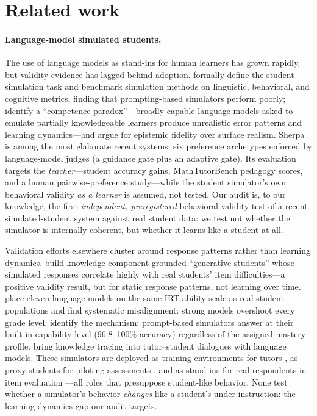 \documentclass[12pt,a4paper]{article}
\begin{document}
\section{Related work}
\label{sec:related}

\paragraph{Language-model simulated students.} The use of language models as
stand-ins for human learners has grown rapidly, but validity evidence has
lagged behind adoption. \citet{scarlatos2026} formally define the
student-simulation task and benchmark simulation methods on linguistic,
behavioral, and cognitive metrics, finding that prompting-based simulators
perform poorly; \citet{yuan2026} identify a ``competence paradox''---broadly
capable language models asked to emulate partially knowledgeable learners
produce unrealistic error patterns and learning dynamics---and argue for
epistemic fidelity over surface realism. Sherpa \citep{xu2026sherpa} is
among the most elaborate recent systems: six preference archetypes enforced
by language-model judges (a guidance gate plus an adaptive gate). Its
evaluation targets the \emph{teacher}---student accuracy gains,
MathTutorBench pedagogy scores, and a human pairwise-preference study---while
the student simulator's own behavioral validity \emph{as a learner} is
assumed, not tested. Our audit is, to our knowledge, the first
\emph{independent, preregistered} behavioral-validity test of a recent
simulated-student system against real student data: we test not whether the
simulator is internally coherent, but whether it learns like a student at
all.

Validation efforts elsewhere cluster around response patterns rather than
learning dynamics. \citet{lu2024} build knowledge-component-grounded
``generative students'' whose simulated responses correlate highly with real
students' item difficulties---a positive validity result, but for static
response patterns, not learning over time. \citet{srivatsa2025} place eleven
language models on the same IRT ability scale as real student populations
and find systematic misalignment: strong models overshoot every grade level.
\citet{an2026} identify the mechanism: prompt-based simulators answer at
their built-in capability level (96.8--100\% accuracy) regardless of the
assigned mastery profile. \citet{scarlatos2025} bring knowledge tracing into
tutor--student dialogues with language models. These simulators are deployed
as training environments for tutors \citep{xu2026sherpa}, as proxy students
for piloting assessments \citep{srivatsa2025}, and as stand-ins for real
respondents in item evaluation \citep{lu2024}---all roles that presuppose
student-like behavior. None test whether a simulator's behavior
\emph{changes} like a student's under instruction: the learning-dynamics gap
our audit targets.
\end{document}

